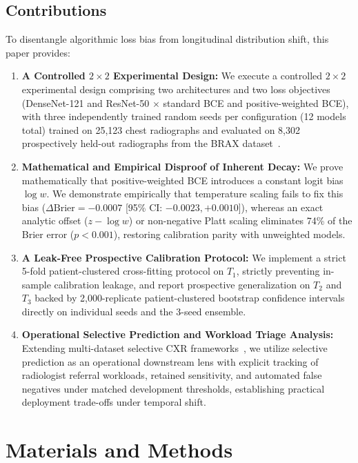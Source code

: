 \documentclass[journal]{IEEEtran}
\begin{document}
\subsection{Contributions}
To disentangle algorithmic loss bias from longitudinal distribution shift, this paper provides:
\begin{enumerate}
    \item \textbf{A Controlled $2 \times 2$ Experimental Design:} We execute a controlled $2 \times 2$ experimental design comprising two architectures and two loss objectives (DenseNet-121 and ResNet-50 $\times$ standard BCE and positive-weighted BCE), with three independently trained random seeds per configuration (12 models total) trained on 25,123 chest radiographs and evaluated on 8,302 prospectively held-out radiographs from the BRAX dataset~\cite{reis2022brax}.
    \item \textbf{Mathematical and Empirical Disproof of Inherent Decay:} We prove mathematically that positive-weighted BCE introduces a constant logit bias $\log w$. We demonstrate empirically that temperature scaling fails to fix this bias ($\Delta\text{Brier} = -0.0007$ [95\% CI: $-0.0023, +0.0010$]), whereas an exact analytic offset ($z - \log w$) or non-negative Platt scaling eliminates 74\% of the Brier error ($p < 0.001$), restoring calibration parity with unweighted models.
    \item \textbf{A Leak-Free Prospective Calibration Protocol:} We implement a strict 5-fold patient-clustered cross-fitting protocol on $T_1$, strictly preventing in-sample calibration leakage, and report prospective generalization on $T_2$ and $T_3$ backed by 2,000-replicate patient-clustered bootstrap confidence intervals directly on individual seeds and the 3-seed ensemble.
    \item \textbf{Operational Selective Prediction and Workload Triage Analysis:} Extending multi-dataset selective CXR frameworks~\cite{aperstein2026knowing}, we utilize selective prediction as an operational downstream lens with explicit tracking of radiologist referral workloads, retained sensitivity, and automated false negatives under matched development thresholds, establishing practical deployment trade-offs under temporal shift.
\end{enumerate}

\section{Materials and Methods}
\end{document}
